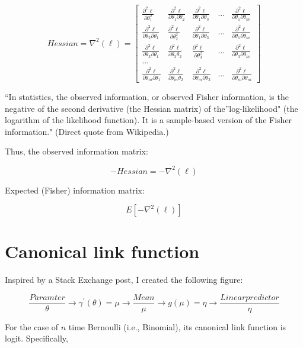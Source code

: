 \documentclass[]{book}
\begin{document}
\[Hessian=\nabla ^2(\ell) =\begin{bmatrix}
\frac{\partial^2 \ell}{\partial \theta_1^2} & \frac{\partial^2 \ell}{\partial \theta_1 \partial \theta_2} & \frac{\partial^2 \ell}{\partial \theta_1 \partial \theta_3} & ... & \frac{\partial^2 \ell}{\partial \theta_1 \partial \theta_m}\\
\frac{\partial^2 \ell}{\partial \theta_2 \partial \theta_1} & \frac{\partial^2 \ell}{\partial \theta_2^2 } & \frac{\partial^2 \ell}{\partial \theta_1 \partial \theta_3} & ... & \frac{\partial^2 \ell}{\partial \theta_1 \partial \theta_m} \\
\frac{\partial^2 \ell}{\partial \theta_3 \partial \theta_1} & \frac{\partial^2 \ell}{\partial \theta_3 \theta_2 } & \frac{\partial^2 \ell}{\partial \theta_3^2} & ... & \frac{\partial^2 \ell}{\partial \theta_3 \partial \theta_m} \\
...\\
\frac{\partial^2 \ell}{\partial \theta_m \partial \theta_1} & \frac{\partial^2 \ell}{\partial \theta_m \theta_2 } & \frac{\partial^2 \ell}{\partial \theta_m \partial \theta_3} & ... & \frac{\partial^2 \ell}{\partial \theta_m \partial \theta_m} 
\end{bmatrix}\]

``In statistics, the observed information, or observed Fisher
information, is the negative of the second derivative (the Hessian
matrix) of the''log-likelihood" (the logarithm of the likelihood
function). It is a sample-based version of the Fisher information."
(Direct quote from Wikipedia.)

Thus, the observed information matrix:

\[-Hessian=-\nabla ^2(\ell) \]

Expected (Fisher) information matrix:

\[E[-\nabla ^2(\ell)] \]

\section{Canonical link function}\label{canonical-link-function}

Inspired by a Stack Exchange post, I created the following figure:

\[ \frac{Paramter}{\theta} \longrightarrow \gamma^{'}(\theta) = \mu \longrightarrow \frac{Mean}{\mu} \longrightarrow g(\mu) = \eta \longrightarrow \frac{ Linear predictor}{\eta} \]

For the case of \(n\) time Bernoulli (i.e., Binomial), its canonical
link function is logit. Specifically,
\end{document}
